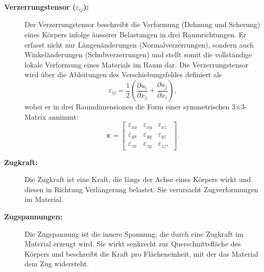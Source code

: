 \begin{description}
\item[\textbf{Verzerrungstensor ($\varepsilon_{ij}$):}] Der Verzerrungstensor beschreibt die Verformung (Dehnung und Scherung) eines Körpers infolge äusserer Belastungen in drei Raumrichtungen. 
Er erfasst nicht nur Längenänderungen (Normalverzerrungen), sondern auch Winkeländerungen (Schubverzerrungen) und stellt somit die vollständige lokale Verformung eines Materials im Raum dar.
Die Verzerrungstensor wird über die Ableitungen des Verschiebungsfeldes definiert als
	\begin{equation}
		\varepsilon_{ij} = 
		\frac{1}{2} \left( \frac{\partial u_i}{\partial x_j} + \frac{\partial u_j}{\partial x_i} \right),
	\end{equation}
	wobei er in drei Raumdimensionen die Form einer symmetrischen 3×3-Matrix annimmt:
	\begin{equation}
		\boldsymbol{\varepsilon} =
		\begin{bmatrix}
			\varepsilon_{xx} & \varepsilon_{xy} & \varepsilon_{xz} \\
			\varepsilon_{yx} & \varepsilon_{yy} & \varepsilon_{yz} \\
			\varepsilon_{zx} & \varepsilon_{zy} & \varepsilon_{zz},
		\end{bmatrix}.
	\end{equation}
\item[\textbf{Zugkraft:}] Die Zugkraft ist eine Kraft, die längs der Achse eines Körpers wirkt und diesen in Richtung Verlängerung belastet. 
Sie verursacht Zugverformungen im Material.
	
\item[\textbf{Zugspannungen:}] Die Zugspannung ist die innere Spannung, die durch eine Zugkraft im Material erzeugt wird. 
Sie wirkt senkrecht zur Querschnittsfläche des Körpers und beschreibt die Kraft pro Flächeneinheit, mit der das Material dem Zug widersteht.
\end{description}

